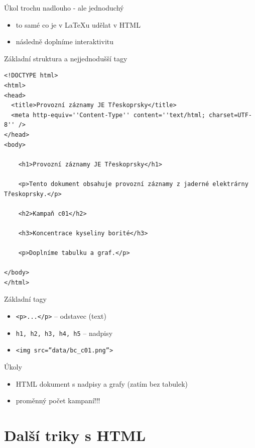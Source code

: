 \documentclass{beamer}
\begin{document}
\begin{frame}{Úkol trochu nadlouho - ale jednoduchý}
  \begin{itemize}
    \item to samé co je v LaTeXu udělat v HTML
    \item následně doplníme interaktivitu
  \end{itemize}
\end{frame}

\begin{frame}[fragile]{Základní struktura a nejjednodušší tagy}
  \tiny
  \begin{verbatim}
<!DOCTYPE html>
<html>
<head>
  <title>Provozní záznamy JE Třeskoprsky</title>
  <meta http-equiv=''Content-Type'' content=''text/html; charset=UTF-8'' />
</head>
<body>

    <h1>Provozní záznamy JE Třeskoprsky</h1>

    <p>Tento dokument obsahuje provozní záznamy z jaderné elektrárny Třeskoprsky.</p>

    <h2>Kampaň c01</h2>

    <h3>Koncentrace kyseliny borité</h3>

    <p>Doplníme tabulku a graf.</p>

</body>
</html>
  \end{verbatim}
\end{frame}

\begin{frame}[fragile]{Základní tagy}
  \begin{itemize}
    \item \texttt{<p>...</p>} -- odstavec (text)
    \item \texttt{h1, h2, h3, h4, h5} -- nadpisy
    \item \texttt{<img src=''data/bc\_c01.png''>}
  \end{itemize}
\end{frame}

\begin{frame}{Úkoly}
  \begin{itemize}
    \item HTML dokument s nadpisy a grafy (zatím bez tabulek)
    \item proměnný počet kampaní!!!
  \end{itemize}
\end{frame}

\section{Další triky s HTML}
\end{document}
